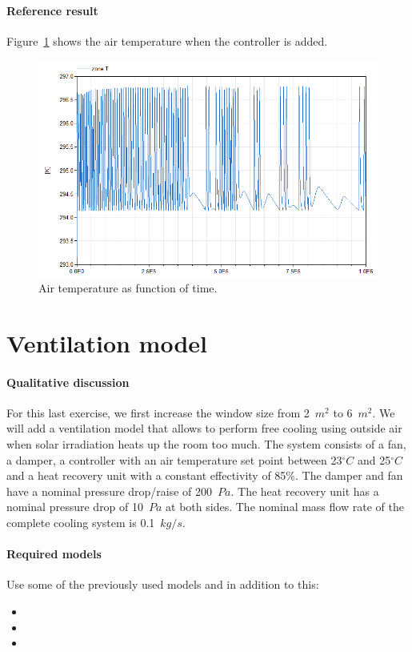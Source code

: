 \documentclass[10pt,a4paper]{article}
\begin{document}
\paragraph{Reference result}
Figure~\ref{fig:res5} shows the air temperature when
the controller is added.

\begin{figure}[h!]
\centering
\includegraphics[scale=0.6]{result5.png}
\caption{Air temperature as function of time.}
\label{fig:res5}
\end{figure}

\newpage

\section{Ventilation model}
\label{ch:ventilation}
\paragraph{Qualitative discussion}
For this last exercise, we first increase the window size from
2~$m^2$ to 6~$m^2$.
We will add a ventilation model that allows to
perform free cooling using outside air when
solar irradiation heats up the room too much.
The system consists of a fan,
a damper,
a controller with an air temperature 
set point between 23$^{\circ}C$ and 25$^{\circ}C$
and a heat recovery unit with a constant effectivity of 85\%.
The damper and fan have a nominal pressure drop/raise of 200~$Pa$. The heat recovery unit has a nominal pressure drop of 10~$Pa$ at both sides.
The nominal mass flow rate of the complete cooling system is 0.1~$kg/s$.

\paragraph{Required models}
Use some of the previously used models and in addition to this:
\begin{itemize}
\item {}
\item {}
\item {}
\end{itemize}
\end{document}
